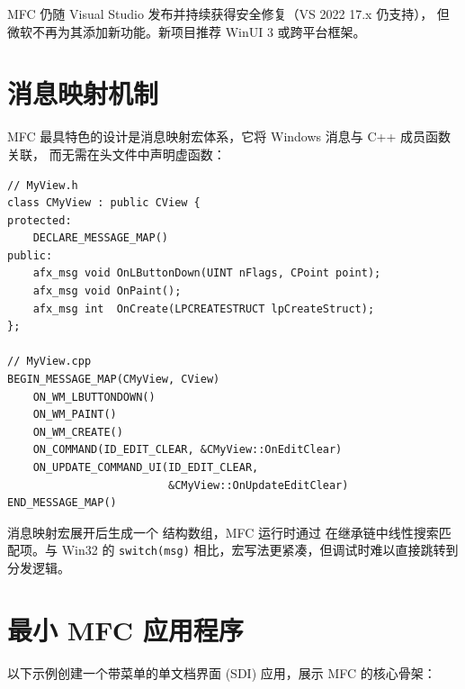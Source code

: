 \documentclass[12pt,a4paper,fontset=fandol]{ctexbook}
\newcommand{\cpplabel}{%
  \tcbox[on line,colback=cppheadbg,colframe=cppheadbg,
    boxrule=0pt,arc=1pt,left=2pt,right=2pt,top=1pt,bottom=1pt,
    colupper=white,fontupper=\scriptsize\bfseries]{C++}}
\newcommand{\Tp}[1]{\texttt{#1}}
\begin{document}
\begin{note}[title=MFC 现状]
MFC 仍随 Visual Studio 发布并持续获得安全修复（VS 2022 17.x 仍支持），
但微软不再为其添加新功能。新项目推荐 WinUI 3 或跨平台框架。
\end{note}

\section{消息映射机制}

MFC 最具特色的设计是消息映射宏体系，它将 Windows 消息与 C++ 成员函数关联，
而无需在头文件中声明虚函数：

\cpplabel
\begin{lstlisting}[style=cppstyle]
// MyView.h
class CMyView : public CView {
protected:
    DECLARE_MESSAGE_MAP()
public:
    afx_msg void OnLButtonDown(UINT nFlags, CPoint point);
    afx_msg void OnPaint();
    afx_msg int  OnCreate(LPCREATESTRUCT lpCreateStruct);
};

// MyView.cpp
BEGIN_MESSAGE_MAP(CMyView, CView)
    ON_WM_LBUTTONDOWN()
    ON_WM_PAINT()
    ON_WM_CREATE()
    ON_COMMAND(ID_EDIT_CLEAR, &CMyView::OnEditClear)
    ON_UPDATE_COMMAND_UI(ID_EDIT_CLEAR,
                         &CMyView::OnUpdateEditClear)
END_MESSAGE_MAP()
\end{lstlisting}

消息映射宏展开后生成一个  结构数组，MFC 运行时通过
 在继承链中线性搜索匹配项。与 Win32 的
\Tp{switch(msg)} 相比，宏写法更紧凑，但调试时难以直接跳转到分发逻辑。

\section{最小 MFC 应用程序}

以下示例创建一个带菜单的单文档界面 (SDI) 应用，展示 MFC 的核心骨架：
\end{document}
